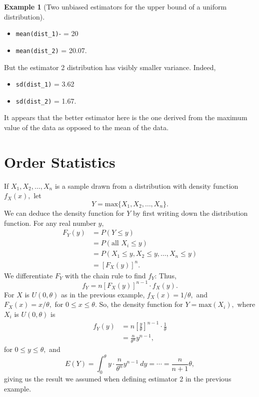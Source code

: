 \documentclass[
]{book}
\providecommand{\tightlist}{%
  \setlength{\itemsep}{0pt}\setlength{\parskip}{0pt}}
\theoremstyle{definition}
\theoremstyle{definition}
\newtheorem{example}{Example}[chapter]
\theoremstyle{definition}
\theoremstyle{definition}
\theoremstyle{remark}
\begin{document}
\begin{example}[Two unbiased estimators for the upper bound of a uniform distribution]
\begin{itemize}
\tightlist
\item
  \texttt{mean(dist\_1)}- = 20
\item
  \texttt{mean(dist\_2)} = 20.07.
\end{itemize}

But the estimator 2 distribution has visibly smaller variance. Indeed,

\begin{itemize}
\tightlist
\item
  \texttt{sd(dist\_1)} = 3.62
\item
  \texttt{sd(dist\_2)} = 1.67.
\end{itemize}

It appears that the better estimator here is the one derived from the maximum value of the data as opposed to the mean of the data.
\end{example}

\section{Order Statistics}\label{order-statistics}

If \(X_1, X_2, \ldots, X_n\) is a sample drawn from a distribution with density function \(f_X(x),\) let \[Y = \text{max}\{X_1, X_2, \ldots, X_n\}.\]
We can deduce the density function for \(Y\) by first writing down the distribution function. For any real number \(y,\)
\begin{align*}
F_Y(y) &= P(Y \leq y) \\
      &= P(\text{all }X_i \leq y) \\
      &= P(X_1 \leq y, X_2 \leq y, \ldots, X_n \leq y) \\
      &= \left[F_X(y)\right]^n.
\end{align*}
We differentiate \(F_Y\) with the chain rule to find \(f_Y\):
Thus, \[f_Y = n\left[F_X(y)\right]^{n-1}\cdot f_X(y). \tag{density for the max of sample}\]
For \(X\) is \(U(0,\theta)\) as in the previous example, \(f_X(x) = 1/\theta,\) and \(F_X(x) = x/\theta,\) for \(0 \leq x \leq \theta\). So, the density function for \(Y = \text{max}(X_i),\) where \(X_i\) is \(U(0,\theta)\) is
\begin{align*}
f_Y(y) &= n \left[\frac{y}{\theta}\right]^{n-1} \cdot \frac{1}{\theta}\\
      &= \frac{n}{\theta^n}y^{n-1},
\end{align*}
for \(0 \leq y \leq \theta,\)
and \[E(Y) = \int_0^\theta y \cdot \frac{n}{\theta^n}y^{n-1}~dy = \cdots = \frac{n}{n+1}\theta,\]
giving us the result we assumed when defining estimator 2 in the previous example.
\end{document}
